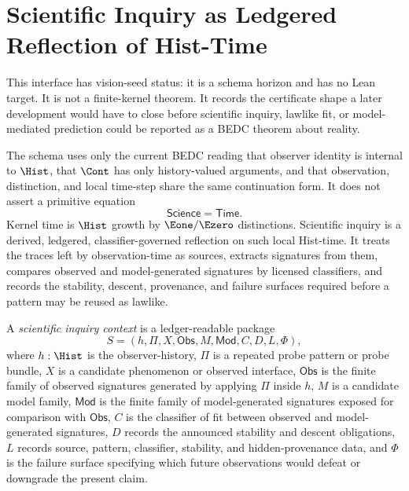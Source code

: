\section{Scientific Inquiry as Ledgered Reflection of Hist-Time}
\label{sec:scientific-inquiry-ledgered-reflection-hist-time}

\begin{remark}
\label{rem:scientific-inquiry-hist-time-vision-seed-status}
This interface has vision-seed status: it is a schema horizon and has no
Lean target. It is not a finite-kernel theorem. It records the certificate
shape a later development would have to close before scientific inquiry,
lawlike fit, or model-mediated prediction could be reported as a BEDC
theorem about reality.

The schema uses only the current BEDC reading that observer identity is
internal to $\Hist$, that $\Cont$ has only history-valued arguments, and
that observation, distinction, and local time-step share the same
continuation form. It does not assert a primitive equation
$$
\mathsf{Science}=\mathsf{Time}.
$$
Kernel time is $\Hist$ growth by $\Eone/\Ezero$ distinctions. Scientific
inquiry is a derived, ledgered, classifier-governed reflection on such
local Hist-time. It treats the traces left by observation-time as sources,
extracts signatures from them, compares observed and model-generated
signatures by licensed classifiers, and records the stability, descent,
provenance, and failure surfaces required before a pattern may be reused
as lawlike.
\end{remark}

\begin{definition}
\label{def:scientific-inquiry-context}
A \emph{scientific inquiry context} is a ledger-readable package
$$
S=(h,\Pi,X,\mathsf{Obs},M,\mathsf{Mod},C,D,L,\Phi),
$$
where $h:\Hist$ is the observer-history, $\Pi$ is a repeated probe
pattern or probe bundle, $X$ is a candidate phenomenon or observed
interface, $\mathsf{Obs}$ is the finite family of observed signatures
generated by applying $\Pi$ inside $h$, $M$ is a candidate model family,
$\mathsf{Mod}$ is the finite family of model-generated signatures exposed
for comparison with $\mathsf{Obs}$, $C$ is the classifier of fit between
observed and model-generated signatures, $D$ records the announced
stability and descent obligations, $L$ records source, pattern,
classifier, stability, and hidden-provenance data, and $\Phi$ is the
failure surface specifying which future observations would defeat or
downgrade the present claim.
\end{definition}

